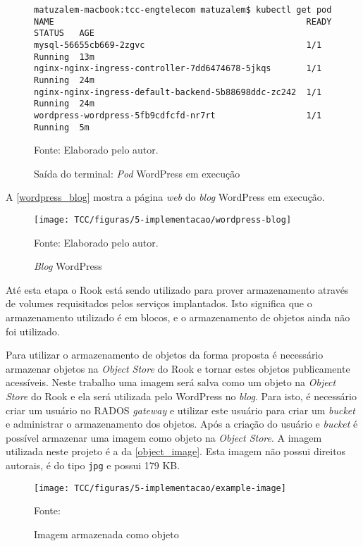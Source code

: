 \begin{figure}[!htpb]
	\centering
	\caption{Saída do terminal: \textit{Pod} WordPress em execução}
    \begin{verbatim}
matuzalem-macbook:tcc-engtelecom matuzalem$ kubectl get pod
NAME                                                  READY     STATUS   AGE
mysql-56655cb669-2zgvc                                1/1       Running  13m
nginx-nginx-ingress-controller-7dd6474678-5jkqs       1/1       Running  24m
nginx-nginx-ingress-default-backend-5b88698ddc-zc242  1/1       Running  24m
wordpress-wordpress-5fb9cdfcfd-nr7rt                  1/1       Running  5m
    \end{verbatim}
	Fonte: Elaborado pelo autor.
 	\label{wordpress_pod}
\end{figure}

A \autoref{wordpress_blog} mostra a página \textit{web} do \textit{blog} WordPress em execução.

\begin{figure}[!htpb]
	\centering
	\caption{\textit{Blog} WordPress}
    \texttt{[image: TCC/figuras/5-implementacao/wordpress-blog]}
    
	Fonte: Elaborado pelo autor.
 	\label{wordpress_blog}
\end{figure}

Até esta etapa o Rook está sendo utilizado para prover armazenamento através de volumes requisitados pelos serviços implantados. Isto significa que o armazenamento utilizado é em blocos, e o armazenamento de objetos ainda não foi utilizado.

Para utilizar o armazenamento de objetos da forma proposta é necessário armazenar objetos na \textit{Object Store} do Rook e tornar estes objetos publicamente acessíveis. Neste trabalho uma imagem será salva como um objeto na \textit{Object Store} do Rook e ela será utilizada pelo WordPress no \textit{blog}. Para isto, é necessário criar um usuário no \ac{RADOS} \textit{gateway} e utilizar este usuário para criar um \textit{bucket} e administrar o armazenamento dos objetos. Após a criação do usuário e \textit{bucket} é possível armazenar uma imagem como objeto na \textit{Object Store}. A imagem utilizada neste projeto é a da \autoref{object_image}. Esta imagem não possui direitos autorais, é do tipo \texttt{jpg} e possui 179 KB.

\begin{figure}[!htpb]
	\centering
	\caption{Imagem armazenada como objeto}
    \texttt{[image: TCC/figuras/5-implementacao/example-image]}
    
	Fonte: \cite{image}
 	\label{object_image}
\end{figure}


